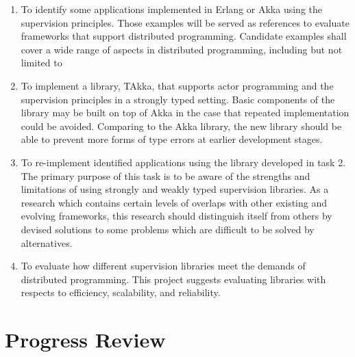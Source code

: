\documentclass[11pt, a4paper, authoryear]{article}
\begin{document}
\begin{enumerate}
  \item To identify some applications implemented in Erlang or Akka using the 
supervision principles.  Those examples will be served as references to 
evaluate frameworks that support distributed programming.  Candidate examples 
shall cover a wide range of aspects in distributed programming, including but 
not limited to 
    
  \item To implement a library, TAkka, that supports actor programming and the 
supervision principles in a strongly typed setting.  Basic components of the 
library may be built on top of Akka\citep{akka_doc} in the case that repeated 
implementation could be avoided.  Comparing to the Akka library, the new library 
should be able to prevent more forms of type errors at earlier development 
stages.
    
  \item To re-implement identified applications using the library developed in 
task 2.  The primary purpose of this task is to be aware of the strengths and 
limitations of using strongly and weakly typed supervision libraries.  As a 
research which contains certain levels of overlaps with other existing and 
evolving frameworks, this research should distinguish itself from others by 
devised solutions to some problems which are difficult to be solved by 
alternatives.

  \item To evaluate how different supervision libraries meet the demands of 
distributed programming.  This project suggests evaluating libraries with
respects to efficiency, scalability, and reliability.
\end{enumerate}


\section{Progress Review}
\end{document}
